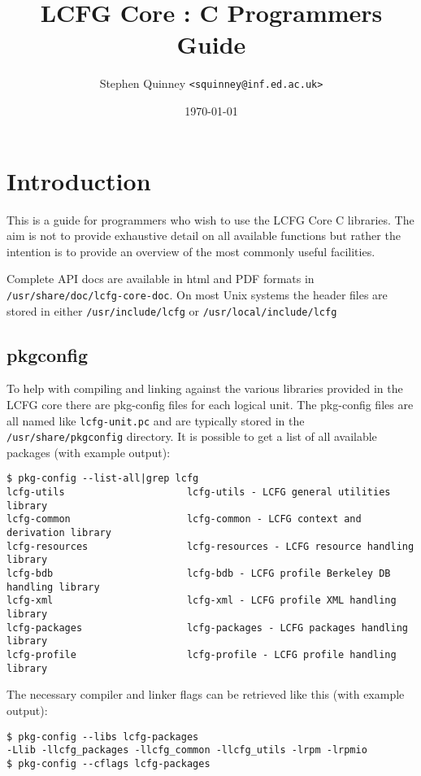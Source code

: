 \documentclass[11pt,a4paper,titlepage]{article}
\title{LCFG Core : C Programmers Guide}
\author{Stephen Quinney \texttt{<squinney@inf.ed.ac.uk>}}
\date{\today}
\begin{document}
\maketitle

\tableofcontents
\clearpage

\section{Introduction}

This is a guide for programmers who wish to use the LCFG Core C
libraries. The aim is not to provide exhaustive detail on all available
functions but rather the intention is to provide an overview of the
most commonly useful facilities. 

Complete API docs are available in html and PDF formats in
\texttt{/usr/share/doc/lcfg-core-doc}. On most Unix systems the header
files are stored in either \texttt{/usr/include/lcfg} or
\texttt{/usr/local/include/lcfg}

\subsection{pkgconfig}

To help with compiling and linking against the various libraries
provided in the LCFG core there are pkg-config files for each logical
unit. The pkg-config files are all named like \texttt{lcfg-unit.pc}
and are typically stored in the \texttt{/usr/share/pkgconfig}
directory. It is possible to get a list of all available packages
(with example output):

\begin{verbatim}
$ pkg-config --list-all|grep lcfg
lcfg-utils                     lcfg-utils - LCFG general utilities library
lcfg-common                    lcfg-common - LCFG context and derivation library
lcfg-resources                 lcfg-resources - LCFG resource handling library
lcfg-bdb                       lcfg-bdb - LCFG profile Berkeley DB handling library
lcfg-xml                       lcfg-xml - LCFG profile XML handling library
lcfg-packages                  lcfg-packages - LCFG packages handling library
lcfg-profile                   lcfg-profile - LCFG profile handling library
\end{verbatim}

The necessary compiler and linker flags can be retrieved like this
(with example output):

\begin{verbatim}
$ pkg-config --libs lcfg-packages
-Llib -llcfg_packages -llcfg_common -llcfg_utils -lrpm -lrpmio
$ pkg-config --cflags lcfg-packages
\end{verbatim}
\end{document}
